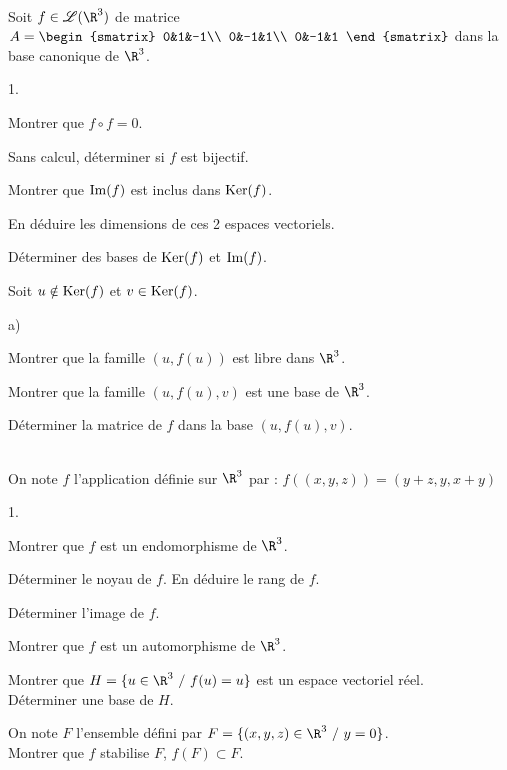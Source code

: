 \documentclass[11pt]{article}%
\begin{document}
\begin{exercice}~\\
Soit $f \in \LL{\R^3}$ de matrice $A= \begin{smatrix} 0&1&-1\\ 0&-1&1\\ 0&-1&1 
\end{smatrix}$ dans la base canonique de $\R^3$.
\begin{noliste}{1.}
\item Montrer que $f \circ f =0$.
\item Sans calcul, déterminer si $f$ est bijectif.
\item Montrer que $\operatorname{Im}(f)$ est inclus dans $\operatorname{Ker}(f)$.
\item En déduire les dimensions de ces 2 espaces vectoriels.
\item Déterminer des bases de $\operatorname{Ker}(f)$ et $\operatorname{Im}(f)$.
\item Soit $u \notin \operatorname{Ker}(f)$ et $v \in \operatorname{Ker}(f)$.
\begin{noliste}{a)}
\item Montrer que la famille $(u,f(u))$ est libre dans $\R^3$.
\item Montrer que la famille $(u,f(u),v)$ est une base de $\R^3$.
\item Déterminer la matrice de $f$ dans la base $(u,f(u),v)$.
\end{noliste}
\end{noliste}
\end{exercice}


\begin{exercice}~\\
On note $f$ l'application définie sur $\R^3$ par : 
$f((x,y,z))=(y+z,y,x+y)$
\begin{noliste}{1.}
\item Montrer que $f$ est un endomorphisme de $\R^3$.
\item Déterminer le noyau de $f$. En déduire le rang de $f$.
\item Déterminer l'image de $f$.
\item Montrer que $f$ est un automorphisme de $\R^3$.
\item Montrer que $H=\{ u \in \R^3 \ / \ f(u)=u\}$ est un espace 
vectoriel réel.\\
Déterminer une base de $H$.
\item On note $F$ l'ensemble défini par $F=\{(x,y,z)\in\R^3 \ / \ 
y=0\}$.\\
Montrer que $f$ stabilise $F$, \ie $f(F)\subset F$.
\end{noliste}
\end{exercice}
\end{document}

